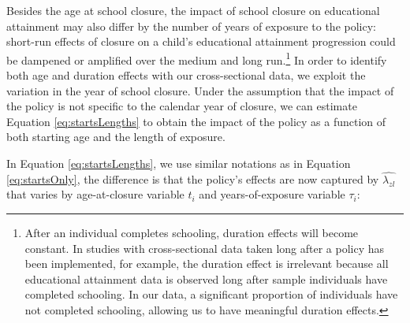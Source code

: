 \label{subsec:estione}

Besides the age at school closure, the impact of school closure on educational attainment may also differ by the number of years of exposure to the policy: short-run effects of closure on a child's educational attainment progression could be dampened or amplified over the medium and long run.\footnote{After an individual completes schooling, duration effects will become constant. In studies with cross-sectional data taken long after a policy has been implemented, \textcite{duflo_2001_school} for example, the duration effect is irrelevant because all educational attainment data is observed long after sample individuals have completed schooling. In our data, a significant proportion of individuals have not completed schooling, allowing us to have meaningful duration effects.}  In order to identify both age and duration effects with our cross-sectional data, we exploit the variation in the year of school closure. Under the assumption that the impact of the policy is not specific to the calendar year of closure, we can estimate Equation \ref{eq:startsLengths} to obtain the impact of the policy as a function of both starting age and the length of exposure.

In Equation \ref{eq:startsLengths}, we use similar notations as in Equation \ref{eq:startsOnly}, the difference is that the policy's effects are now captured by $\hat{\lambda_{zl}}$ that varies by age-at-closure variable \(t_{i}\) and years-of-exposure variable $\tau_{i}$:

